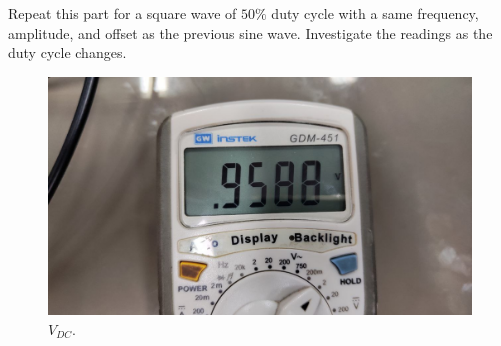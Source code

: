 \documentclass[11pt]{article}
\newcommand{\PicScale}{0.2}
\begin{document}
\begin{question}
\begin{subquestion}{Repeat this part for a square wave of $50\%$ duty cycle with a same frequency, amplitude, and offset as the previous sine wave. Investigate the readings as the duty cycle changes.}
{    \begin{figure}[H]
        \begin{center}
            \includegraphics[scale=\PicScale]{Fig/32.jpeg}
            \caption{$V_{DC}$.}
        \end{center}
    \end{figure}

}
\end{subquestion}
\end{question}
\end{document}

